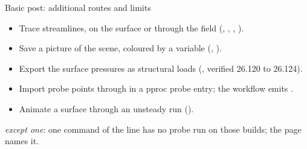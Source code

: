 \begin{frame}{Basic post: additional routes and limits}
\begin{itemize}\small
  \item Trace streamlines, on the surface or through the field (, , , ).
  \item Save a picture of the scene, coloured by a variable (, ).
  \item Export the surface pressures as structural loads (, verified 26.120 to 26.124).
  \item Import probe points through  in a pproc probe entry;
        the workflow emits .
  \item Animate a surface through an unsteady run ().
\end{itemize}
{\scriptsize \emph{except one}: one command of the line has no probe run on those builds; the page names it.\par}
\end{frame}
